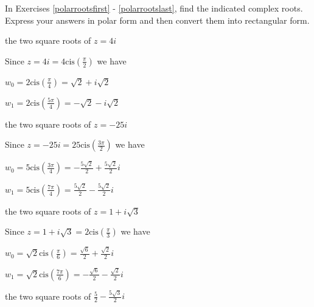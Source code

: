\documentclass{ximera}
\begin{document}
\begin{question}
In Exercises \ref{polarrootsfirst} - \ref{polarrootslast}, find the indicated complex roots.  Express your answers in polar form and then convert them into rectangular form.

\begin{problem} \label{polarrootsfirst}
the two square roots of $z = 4i$ 

\begin{solution}
Since $z=4i = 4\text{cis}\left(\frac{\pi}{2}\right)$ we have 

$w_{0} = 2\text{cis}\left(\frac{\pi}{4}\right) = \sqrt{2} +i\sqrt{2}$

$w_{1} = 2\text{cis}\left(\frac{5\pi}{4}\right) = -\sqrt{2} - i\sqrt{2}$


\end{solution}
\end{problem}

\begin{problem}
the two square roots of $z = -25i$

\begin{solution}
Since $z=-25i = 25\text{cis}\left(\frac{3\pi}{2}\right)$ we have 

$w_{0} = 5\text{cis}\left(\frac{3\pi}{4}\right) = -\frac{5\sqrt{2}}{2} +\frac{5\sqrt{2}}{2} i$

$w_{1} = 5\text{cis}\left(\frac{7\pi}{4}\right) = \frac{5\sqrt{2}}{2} - \frac{5\sqrt{2}}{2} i$

\end{solution}
\end{problem}

\begin{problem}
the two square roots of $z = 1 + i\sqrt{3}$

\begin{solution}

Since $z=1 + i\sqrt{3} = 2\text{cis}\left(\frac{\pi}{3}\right)$ we have 

$w_{0} = \sqrt{2}\text{cis}\left(\frac{\pi}{6}\right) = \frac{\sqrt{6}}{2} +\frac{\sqrt{2}}{2} i$

$w_{1} = \sqrt{2}\text{cis}\left(\frac{7\pi}{6}\right) = -\frac{\sqrt{6}}{2}-\frac{\sqrt{2}}{2} i$


\end{solution}
\end{problem}

\begin{problem}
the two square roots of $\frac{5}{2} - \frac{5\sqrt{3}}{2}i$


\end{problem}
\end{question}
\end{document}
